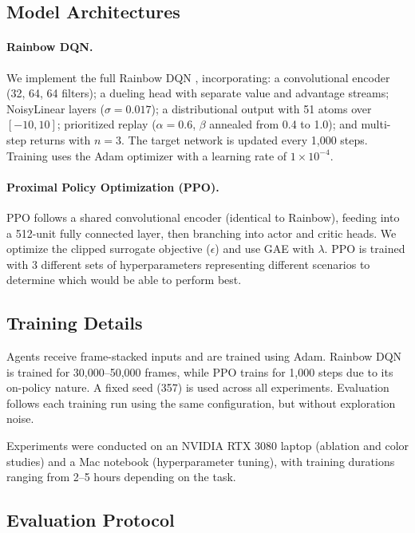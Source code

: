 \documentclass{article}
\begin{document}
\subsection{Model Architectures}

\paragraph{Rainbow DQN.} We implement the full Rainbow DQN \cite{hessel2018rainbow}, incorporating:
a convolutional encoder (32, 64, 64 filters); a dueling head with separate value and advantage streams; NoisyLinear layers ($\sigma=0.017$); a distributional output with 51 atoms over $[-10, 10]$; prioritized replay ($\alpha = 0.6$, $\beta$ annealed from 0.4 to 1.0); and multi-step returns with $n = 3$. The target network is updated every 1,000 steps. Training uses the Adam optimizer with a learning rate of $1 \times 10^{-4}$.

\paragraph{Proximal Policy Optimization (PPO).} PPO follows a shared convolutional encoder (identical to Rainbow), feeding into a 512-unit fully connected layer, then branching into actor and critic heads. We optimize the clipped surrogate objective ($\epsilon$) and use GAE with $\lambda$. PPO is trained with 3 different sets of hyperparameters representing different scenarios to determine which would be able to perform best.

\subsection{Training Details}

Agents receive frame-stacked inputs and are trained using Adam. Rainbow DQN is trained for 30,000–50,000 frames, while PPO trains for 1,000 steps due to its on-policy nature. A fixed seed (357) is used across all experiments. Evaluation follows each training run using the same configuration, but without exploration noise.

Experiments were conducted on an NVIDIA RTX 3080 laptop (ablation and color studies) and a Mac notebook (hyperparameter tuning), with training durations ranging from 2–5 hours depending on the task.

\subsection{Evaluation Protocol}
\end{document}
